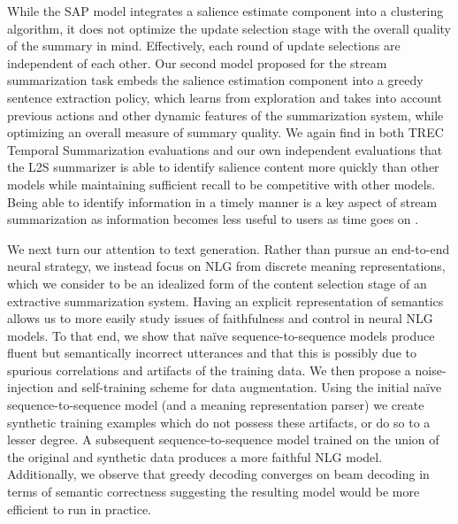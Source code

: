 While the SAP model integrates a salience estimate component into a clustering
algorithm, it does not optimize the update selection stage with the overall
quality of the summary in mind. Effectively, each round of update selections
are independent of each other. Our second model proposed for the stream
summarization task embeds the salience estimation component into a greedy
sentence extraction policy, which learns from exploration and takes into
account previous actions and other dynamic features of the summarization
system, while optimizing an overall measure of summary quality. We again find
in both TREC Temporal Summarization evaluations and our own independent
evaluations that the L2S summarizer is able to identify salience content more
quickly than other models while maintaining sufficient recall to be
competitive with other models. Being able to identify information in a timely
manner is a key aspect of stream summarization as information becomes less
useful to users as time goes on \citep{yomtov2011}.

We next turn our attention to text generation. Rather than pursue an end-to-end
neural strategy, we instead focus on NLG from discrete meaning representations, which
we consider to be an idealized form of the content selection
stage of an extractive summarization system. Having an explicit representation
of semantics allows us to more easily study issues of faithfulness and 
control in neural NLG models.
To that end, we show that na{\"i}ve sequence-to-sequence
models produce fluent but semantically incorrect utterances and that this is
possibly due to spurious correlations and artifacts of the training data.  We
then propose a noise-injection and self-training scheme for data
augmentation. Using the initial na{\"ive} sequence-to-sequence model (and a
meaning representation parser) we create synthetic training examples which do
not possess these artifacts, or do so to a lesser degree. A subsequent
sequence-to-sequence model trained on the union of the original and synthetic
data produces a more faithful NLG model. Additionally, we observe that greedy
decoding converges on beam decoding in terms of semantic correctness
suggesting the resulting model would be more efficient to run in practice.

